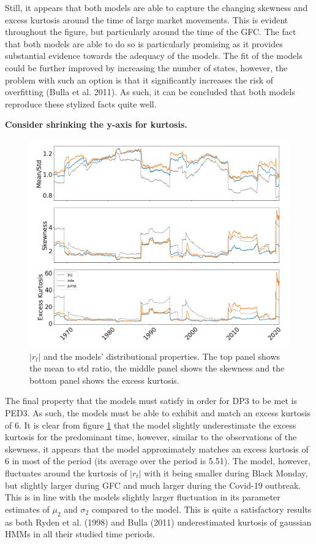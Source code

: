 Still, it appears that both models are able to capture the changing skewness and excess kurtosis around the time of large market movements. This is evident throughout the figure, but particularly around the time of the GFC. The fact that both models are able to do so is particularly promising as it provides substantial evidence towards the adequacy of the models. The fit of the models could be further improved by increasing the number of states, however, the problem with such an option is that it significantly increases the risk of overfitting (Bulla et al. 2011). As such, it can be concluded that both models reproduce these stylized facts quite well.

\textbf{Consider shrinking the y-axis for kurtosis.}
\begin{figure}[H] 
    \centering
    \includegraphics[width=1.0\textwidth]{analysis/stylized_facts/images/moments_bulla_abs.png}
    \caption[$|r_t|$ and the models' distributional properties]{$|r_t|$ and the models' distributional properties. The top panel shows the mean to std ratio, the middle panel shows the skewness and the bottom panel shows the excess kurtosis.}
    \label{fig:stylized_facts_moments_bulla_abs} 
\end{figure}

The final property that the models must satisfy in order for DP3 to be met is PED3. As such, the models must be able to exhibit and match an excess kurtosis of 6. It is clear from figure \ref{fig:stylized_facts_moments_bulla_abs} that the \mle model slightly underestimate the excess kurtosis for the predominant time, however, similar to the observations of the skewness, it appears that the \mle model approximately matches an excess kurtosis of 6 in most of the period (its average over the period is 5.51). The \jump model, however, fluctuates around the kurtosis of $|r_t|$ with it being smaller during Black Monday, but slightly larger during GFC and much larger during the Covid-19 outbreak. This is in line with the \jump models slightly larger fluctuation in its parameter estimates of $\mu_2$ and $\sigma_2$ compared to the \mle model. This is quite a satisfactory results as both Ryden et al. (1998) and Bulla (2011) underestimated kurtosis of gaussian HMMs in all their studied time periods.

